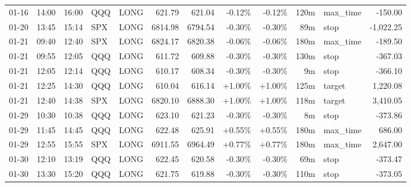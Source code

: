 \documentclass[11pt,a4paper,twoside]{article}
\begin{document}
\begin{center}
\begin{longtable}{>{\color{txtmain}}l l l l l r r r r r >{\color{txtmain}}l r}
01-16 & 14:00 & 16:00 & QQQ & LONG & 621.79 & 621.04 & \textcolor{lossred}{-0.12\%} & \textcolor{lossred}{-0.12\%} & 120m & max\_time & \textcolor{lossred}{-150.00} \\
01-20 & 13:45 & 15:14 & SPX & LONG & 6814.98 & 6794.54 & \textcolor{lossred}{-0.30\%} & \textcolor{lossred}{-0.30\%} & 89m & stop & \textcolor{lossred}{-1,022.25} \\
01-21 & 09:40 & 12:40 & SPX & LONG & 6824.17 & 6820.38 & \textcolor{lossred}{-0.06\%} & \textcolor{lossred}{-0.06\%} & 180m & max\_time & \textcolor{lossred}{-189.50} \\
01-21 & 09:55 & 12:05 & QQQ & LONG & 611.72 & 609.88 & \textcolor{lossred}{-0.30\%} & \textcolor{lossred}{-0.30\%} & 130m & stop & \textcolor{lossred}{-367.03} \\
01-21 & 12:05 & 12:14 & QQQ & LONG & 610.17 & 608.34 & \textcolor{lossred}{-0.30\%} & \textcolor{lossred}{-0.30\%} & 9m & stop & \textcolor{lossred}{-366.10} \\
01-21 & 12:25 & 14:30 & QQQ & LONG & 610.04 & 616.14 & \textcolor{wingreen}{+1.00\%} & \textcolor{wingreen}{+1.00\%} & 125m & target & \textcolor{wingreen}{1,220.08} \\
01-21 & 12:40 & 14:38 & SPX & LONG & 6820.10 & 6888.30 & \textcolor{wingreen}{+1.00\%} & \textcolor{wingreen}{+1.00\%} & 118m & target & \textcolor{wingreen}{3,410.05} \\
01-29 & 10:30 & 10:38 & QQQ & LONG & 623.10 & 621.23 & \textcolor{lossred}{-0.30\%} & \textcolor{lossred}{-0.30\%} & 8m & stop & \textcolor{lossred}{-373.86} \\
01-29 & 11:45 & 14:45 & QQQ & LONG & 622.48 & 625.91 & \textcolor{wingreen}{+0.55\%} & \textcolor{wingreen}{+0.55\%} & 180m & max\_time & \textcolor{wingreen}{686.00} \\
01-29 & 12:55 & 15:55 & SPX & LONG & 6911.55 & 6964.49 & \textcolor{wingreen}{+0.77\%} & \textcolor{wingreen}{+0.77\%} & 180m & max\_time & \textcolor{wingreen}{2,647.00} \\
01-30 & 12:10 & 13:19 & QQQ & LONG & 622.45 & 620.58 & \textcolor{lossred}{-0.30\%} & \textcolor{lossred}{-0.30\%} & 69m & stop & \textcolor{lossred}{-373.47} \\
01-30 & 13:30 & 15:20 & QQQ & LONG & 621.75 & 619.88 & \textcolor{lossred}{-0.30\%} & \textcolor{lossred}{-0.30\%} & 110m & stop & \textcolor{lossred}{-373.05} \\
\end{longtable}
\end{center}
\clearpage
\end{document}
